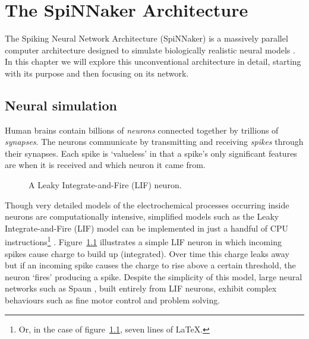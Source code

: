 \chapter{The SpiNNaker Architecture}
	
	\label{sec:background}
	
	The Spiking Neural Network Architecture (SpiNNaker) is a massively parallel
	computer architecture designed to simulate biologically realistic neural
	models \cite{furber07}. In this chapter we will explore this unconventional
	architecture in detail, starting with its purpose and then focusing on its
	network.
	
	
	\section{Neural simulation}
		
		Human brains contain billions of \emph{neurons} connected together by
		trillions of \emph{synapses}. The neurons communicate by transmitting and
		receiving \emph{spikes} through their synapses. Each spike is `valueless'
		in that a spike's only significant features are when it is received and
		which neuron it came from.
		
		\begin{figure}
			\center
			
			\caption{A Leaky Integrate-and-Fire (LIF) neuron.}
			\label{fig:lif-neuron}
		\end{figure}
		
		Though very detailed models of the electrochemical processes occurring
		inside neurons are computationally intensive, simplified models such as the
		Leaky Integrate-and-Fire (LIF) model can be implemented in just a handful
		of CPU instructions\footnote{Or, in the case of figure~\ref{fig:lif-neuron},
		seven lines of \LaTeX{}.} \cite{vainbrand11}. Figure~\ref{fig:lif-neuron}
		illustrates a simple LIF neuron in which incoming spikes cause charge to
		build up (integrated). Over time this charge leaks away but if an incoming
		spike causes the charge to rise above a certain threshold, the neuron
		`fires' producing a spike. Despite the simplicity of this model, large
		neural networks such as Spaun \cite{eliasmith12}, built entirely from LIF
		neurons, exhibit complex behaviours such as fine motor control and problem
		solving.
		
